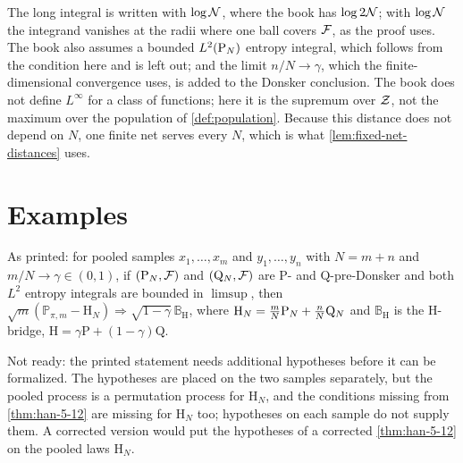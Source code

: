 \begin{remark}
  The long integral is written with $\log\mathcal{N}$, where the book has $\log2\mathcal{N}$; with $\log\mathcal{N}$ the integrand vanishes at the radii where one ball covers $\mathcal{F}$, as the proof uses. The book also assumes a bounded $L^2(\mathrm{P}_N)$ entropy integral, which follows from the condition here and is left out; and the limit $n/N\to\gamma$, which the finite-dimensional convergence uses, is added to the Donsker conclusion. The book does not define $L^\infty$ for a class of functions; here it is the supremum over $\mathcal{Z}$, not the maximum over the population of \cref{def:population}. Because this distance does not depend on $N$, one finite net serves every $N$, which is what \cref{lem:fixed-net-distances} uses.
\end{remark}

\section{Examples}

\begin{corollary}
  \label{cor:han-5-8}
  \notready
  As printed: for pooled samples $x_1,\dots,x_m$ and $y_1,\dots,y_n$ with $N=m+n$ and $m/N\to\gamma\in(0,1)$, if $(\mathrm{P}_N,\mathcal{F})$ and $(\mathrm Q_N,\mathcal{F})$ are $\mathrm P$- and $\mathrm Q$-pre-Donsker and both $L^2$ entropy integrals are bounded in $\limsup$, then $\sqrt m(\mathbb P_{\pi,m}-\mathrm H_N)\Rightarrow\sqrt{1-\gamma}\,\mathbb B_{\mathrm H}$, where $\mathrm H_N=\frac mN\mathrm{P}_N+\frac nN\mathrm Q_N$ and $\mathbb B_{\mathrm H}$ is the $\mathrm H$-bridge, $\mathrm H=\gamma\mathrm P+(1-\gamma)\mathrm Q$.
\end{corollary}
\begin{remark}
  Not ready: the printed statement needs additional hypotheses before it can be formalized. The hypotheses are placed on the two samples separately, but the pooled process is a permutation process for $\mathrm H_N$, and the conditions missing from \cref{thm:han-5-12} are missing for $\mathrm H_N$ too; hypotheses on each sample do not supply them. A corrected version would put the hypotheses of a corrected \cref{thm:han-5-12} on the pooled laws $\mathrm H_N$.
\end{remark}

